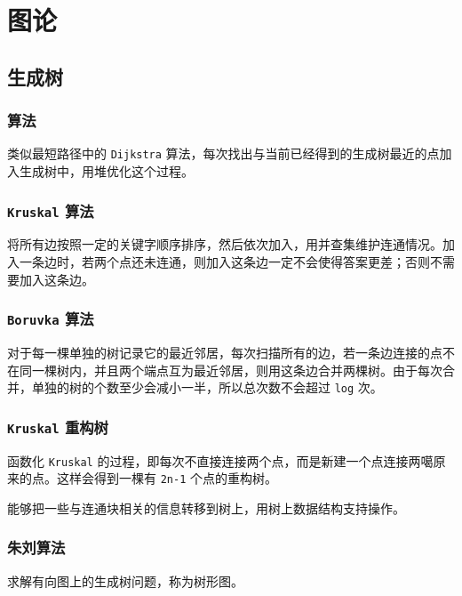 \documentclass[UTF-8]{ctexart}
\begin{document}
	\section{图论}
	\subsection{生成树}
	\subsubsection{ 算法}
	类似最短路径中的 \texttt{Dijkstra} 算法，每次找出与当前已经得到的生成树最近的点加入生成树中，用堆优化这个过程。
	\subsubsection{\texttt{Kruskal} 算法}
	将所有边按照一定的关键字顺序排序，然后依次加入，用并查集维护连通情况。加入一条边时，若两个点还未连通，则加入这条边一定不会使得答案更差；否则不需要加入这条边。
	\subsubsection{\texttt{Boruvka} 算法}
	对于每一棵单独的树记录它的最近邻居，每次扫描所有的边，若一条边连接的点不在同一棵树内，并且两个端点互为最近邻居，则用这条边合并两棵树。由于每次合并，单独的树的个数至少会减小一半，所以总次数不会超过 \texttt{log} 次。
	\subsubsection{\texttt{Kruskal} 重构树}
	函数化 \texttt{Kruskal} 的过程，即每次不直接连接两个点，而是新建一个点连接两噶原来的点。这样会得到一棵有 \texttt{2n-1} 个点的重构树。
	
	能够把一些与连通块相关的信息转移到树上，用树上数据结构支持操作。
	\subsubsection{朱刘算法}
	求解有向图上的生成树问题，称为树形图。
	
\end{document}
